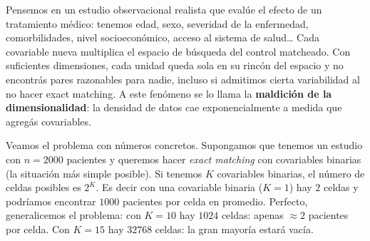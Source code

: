 \documentclass[
  letterpaper,
  DIV=11,
  numbers=noendperiod,
  oneside]{scrreprt}
\begin{document}
Pensemos en un estudio observacional realista que evalúe el efecto de un
tratamiento médico: tenemos edad, sexo, severidad de la enfermedad,
comorbilidades, nivel socioeconómico, acceso al sistema de salud\ldots{}
Cada covariable nueva multiplica el espacio de búsqueda del control
matcheado. Con suficientes dimensiones, cada unidad queda sola en su
rincón del espacio y no encontrás pares razonables para nadie, incluso
si admitimos cierta variabilidad al no hacer exact matching. A este
fenómeno se lo llama la \textbf{maldición de la dimensionalidad}: la
densidad de datos cae exponencialmente a medida que agregás covariables.

Veamos el problema con números concretos. Supongamos que tenemos un
estudio con \(n = 2000\) pacientes y queremos hacer \emph{exact
matching} con covariables binarias (la situación más simple posible). Si
tenemos \(K\) covariables binarias, el número de celdas posibles es
\(2^K\). Es decir con una covariable binaria (\(K = 1\)) hay \(2\)
celdas y podríamos encontrar \(1000\) pacientes por celda en promedio.
Perfecto, generalicemos el problema: con \(K = 10\) hay \(1024\) celdas:
apenas \(\approx 2\) pacientes por celda. Con \(K = 15\) hay \(32768\)
celdas: la gran mayoría estará vacía.
\end{document}
